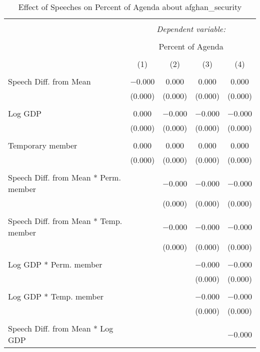 
\begin{table}[!htbp] \centering 
  \caption{Effect of Speeches on Percent of Agenda about afghan_security} 
  \label{} 
\begin{tabular}{@{\extracolsep{5pt}}lcccc} 
\\[-1.8ex]\hline 
\hline \\[-1.8ex] 
 & \multicolumn{4}{c}{\textit{Dependent variable:}} \\ 
\cline{2-5} 
\\[-1.8ex] & \multicolumn{4}{c}{Percent of Agenda} \\ 
\\[-1.8ex] & (1) & (2) & (3) & (4)\\ 
\hline \\[-1.8ex] 
 Speech Diff. from Mean & $-$0.000 & 0.000 & 0.000 & 0.000 \\ 
  & (0.000) & (0.000) & (0.000) & (0.000) \\ 
  & & & & \\ 
 Log GDP & 0.000 & $-$0.000 & $-$0.000 & $-$0.000 \\ 
  & (0.000) & (0.000) & (0.000) & (0.000) \\ 
  & & & & \\ 
 Temporary member & 0.000 & 0.000 & 0.000 & 0.000 \\ 
  & (0.000) & (0.000) & (0.000) & (0.000) \\ 
  & & & & \\ 
 Speech Diff. from Mean * Perm. member &  & $-$0.000 & $-$0.000 & $-$0.000 \\ 
  &  & (0.000) & (0.000) & (0.000) \\ 
  & & & & \\ 
 Speech Diff. from Mean * Temp. member &  & $-$0.000 & $-$0.000 & $-$0.000 \\ 
  &  & (0.000) & (0.000) & (0.000) \\ 
  & & & & \\ 
 Log GDP * Perm. member &  &  & $-$0.000 & $-$0.000 \\ 
  &  &  & (0.000) & (0.000) \\ 
  & & & & \\ 
 Log GDP * Temp. member &  &  & $-$0.000 & $-$0.000 \\ 
  &  &  & (0.000) & (0.000) \\ 
  & & & & \\ 
 Speech Diff. from Mean * Log GDP &  &  &  & $-$0.000 \\ 

\end{tabular}
\end{table}
